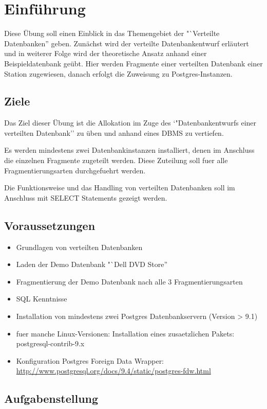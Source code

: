 
\section{Einführung}
Diese Übung soll einen Einblick in das Themengebiet der  "`Verteilte Datenbanken'' geben. Zunächst wird der verteilte Datenbankentwurf erläutert und in weiterer Folge wird der theoretische Ansatz anhand einer Beispieldatenbank geübt. Hier werden Fragmente einer verteilten Datenbank einer Station zugewiesen, danach erfolgt die Zuweisung zu Postgres-Instanzen.

\subsection{Ziele}
Das Ziel dieser Übung ist die Allokation im Zuge des `"Datenbankentwurfs einer verteilten Datenbank'' zu üben und anhand eines DBMS zu vertiefen.

Es werden mindestens zwei Datenbankinstanzen installiert, denen im Anschluss die einzelnen Fragmente zugeteilt werden. Diese Zuteilung soll fuer alle Fragmentierungsarten durchgefuehrt werden.

Die Funktionsweise und das Handling von verteilten Datenbanken soll im Anschluss mit SELECT Statements gezeigt werden.

\subsection{Voraussetzungen}
\begin{itemize}
	\item Grundlagen von verteilten Datenbanken
	\item Laden der Demo Datenbank "`Dell DVD Store''
	\item Fragmentierung der Demo Datenbank nach alle 3 Fragmentierungsarten
	\item SQL Kenntnisse
	\item Installation von mindestens zwei Postgres Datenbankservern (Version > 9.1)
	\item fuer manche Linux-Versionen: Installation eines zusaetzlichen Pakets: postgresql-contrib-9.x
	\item Konfiguration Postgres Foreign Data Wrapper: \url{http://www.postgresql.org/docs/9.4/static/postgres-fdw.html}
\end{itemize}

\subsection{Aufgabenstellung}

